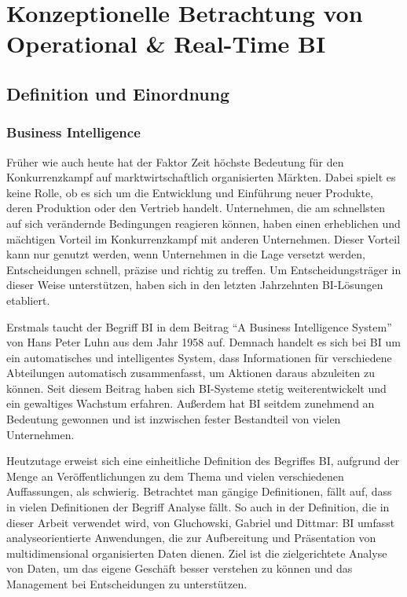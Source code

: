 \chapter{Konzeptionelle Betrachtung von Operational \& Real-Time BI}
\section{Definition und Einordnung}
\subsection{Business Intelligence}
Früher wie auch heute hat der Faktor Zeit höchste Bedeutung für den Konkurrenzkampf auf marktwirtschaftlich organisierten Märkten. Dabei spielt es keine Rolle, ob es sich um die Entwicklung und Einführung neuer Produkte, deren Produktion oder den Vertrieb handelt. Unternehmen, die am schnellsten auf sich verändernde Bedingungen reagieren können, haben einen erheblichen und mächtigen Vorteil im Konkurrenzkampf mit anderen Unternehmen. \autocite[Vgl.][S. 1]{Stalk1988} Dieser Vorteil kann nur genutzt werden, wenn Unternehmen in die Lage versetzt werden, Entscheidungen schnell, präzise und richtig zu treffen. Um Entscheidungsträger in dieser Weise unterstützen, haben sich in den letzten Jahrzehnten \ac{BI}-Lösungen etabliert.

Erstmals taucht der Begriff \ac{BI} in dem Beitrag \enquote{A Business Intelligence System} von Hans Peter Luhn aus dem Jahr 1958 auf. Demnach handelt es sich bei \ac{BI} um ein automatisches und intelligentes System, dass Informationen für verschiedene Abteilungen automatisch zusammenfasst, um Aktionen daraus abzuleiten zu können. \autocite[Vgl.][S. 1]{Luhn1958ABI} Seit diesem Beitrag haben sich \ac{BI}-Systeme stetig weiterentwickelt und ein gewaltiges Wachstum erfahren. Außerdem hat \ac{BI} seitdem zunehmend an Bedeutung gewonnen und ist inzwischen fester Bestandteil von vielen Unternehmen. 

Heutzutage erweist sich eine einheitliche Definition des Begriffes \ac{BI}, aufgrund der Menge an Veröffentlichungen zu dem Thema und vielen verschiedenen Auffassungen, als schwierig. Betrachtet man gängige Definitionen, fällt auf, dass in vielen Definitionen der Begriff Analyse fällt. So auch in der Definition, die in dieser Arbeit verwendet wird, von Gluchowski, Gabriel und Dittmar: \ac{BI} umfasst analyseorientierte Anwendungen, die zur Aufbereitung und Präsentation von multidimensional organisierten Daten dienen. Ziel ist die zielgerichtete Analyse von Daten, um das eigene Geschäft besser verstehen zu können und das Management bei Entscheidungen zu unterstützen. \autocite[Vgl.][S. 89]{Glucho2008} 

